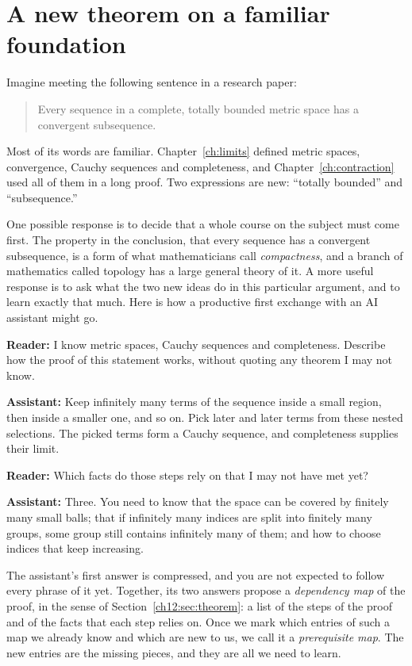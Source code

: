 \section{A new theorem on a familiar foundation}\label{ch17:sec:start}
Imagine meeting the following sentence in a research paper:
\begin{quote}
Every sequence in a complete, totally bounded metric space has a convergent subsequence.
\end{quote}
Most of its words are familiar. Chapter~\ref{ch:limits} defined metric spaces, convergence, Cauchy sequences and completeness, and Chapter~\ref{ch:contraction} used all of them in a long proof. Two expressions are new: ``totally bounded'' and ``subsequence.''

One possible response is to decide that a whole course on the subject must come first. The property in the conclusion, that every sequence has a convergent subsequence, is a form of what mathematicians call \emph{compactness}, and a branch of mathematics called topology has a large general theory of it. A more useful response is to ask what the two new ideas do in this particular argument, and to learn exactly that much. Here is how a productive first exchange with an AI assistant might go.

\textbf{Reader:} I know metric spaces, Cauchy sequences and completeness. Describe how the proof of this statement works, without quoting any theorem I may not know.

\textbf{Assistant:} Keep infinitely many terms of the sequence inside a small region, then inside a smaller one, and so on. Pick later and later terms from these nested selections. The picked terms form a Cauchy sequence, and completeness supplies their limit.

\textbf{Reader:} Which facts do those steps rely on that I may not have met yet?

\textbf{Assistant:} Three. You need to know that the space can be covered by finitely many small balls; that if infinitely many indices are split into finitely many groups, some group still contains infinitely many of them; and how to choose indices that keep increasing.

The assistant's first answer is compressed, and you are not expected to follow every phrase of it yet. Together, its two answers propose a \emph{dependency map} of the proof, in the sense of Section~\ref{ch12:sec:theorem}: a list of the steps of the proof and of the facts that each step relies on. Once we mark which entries of such a map we already know and which are new to us, we call it a \emph{prerequisite map}. The new entries are the missing pieces, and they are all we need to learn.

